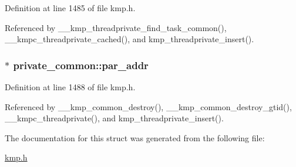 Definition at line 1485 of file kmp.\-h.



Referenced by \-\_\-\-\_\-kmp\-\_\-threadprivate\-\_\-find\-\_\-task\-\_\-common(), \-\_\-\-\_\-kmpc\-\_\-threadprivate\-\_\-cached(), and kmp\-\_\-threadprivate\-\_\-insert().

\hypertarget{structprivate__common_af830d32951feb25766b1ed8b973035fe}{
\subsubsection[{par\-\_\-addr}]{$\ast$ private\-\_\-common\-::par\-\_\-addr}}\label{structprivate__common_af830d32951feb25766b1ed8b973035fe}


Definition at line 1488 of file kmp.\-h.



Referenced by \-\_\-\-\_\-kmp\-\_\-common\-\_\-destroy(), \-\_\-\-\_\-kmp\-\_\-common\-\_\-destroy\-\_\-gtid(), \-\_\-\-\_\-kmpc\-\_\-threadprivate(), and kmp\-\_\-threadprivate\-\_\-insert().



The documentation for this struct was generated from the following file\-:\begin{DoxyCompactItemize}
\item 
\hyperlink{kmp_8h}{kmp.\-h}\end{DoxyCompactItemize}
